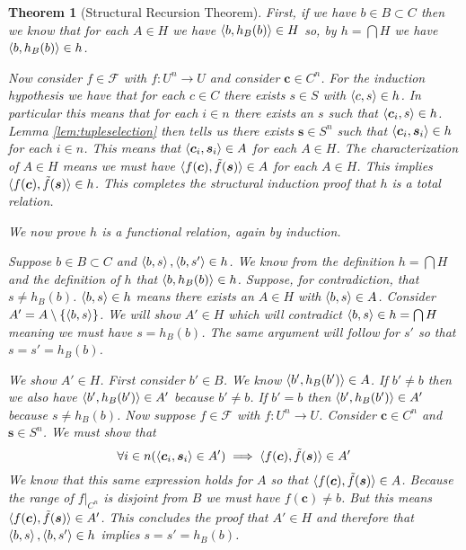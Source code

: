 \documentclass[12pt]{article}
\theoremstyle{break}
\theoremstyle{break}
\newtheorem{theorem}{Theorem}[section]
\theoremstyle{break}
\theoremstyle{break}
\theoremstyle{break}
\newtheorem{informal definition}[definition]{Informal Definition}
\newcommand{\bv}[1]{\boldsymbol{#1}}
\begin{document}
\begin{theorem}[Structural Recursion Theorem]
First, if we have $b \in B \subset C$ then we know that for each $A \in H$ we have $\braket{b, h_B(b)}\in H$ so, by $h = \bigcap H$ we have $\Braket{b, h_B(b)} \in h$.

Now consider $f\in \mathcal{F}$ with $f:U^n \to U$ and consider $\bv{c} \in C^n$.
For the induction hypothesis we have that for each $c\in C$ there exists $s\in S$ with $\braket{c, s} \in h$.
In particular this means that for each $i \in n$ there exists an $s$ such that $\braket{\bv{c}_i, s} \in h$.
Lemma \ref{lem:tupleselection} then tells us there exists $\bv{s}\in S^n$ such that $\braket{\bv{c}_i, \bv{s}_i} \in h$ for each $i\in n$.
This means that $\braket{\bv{c}_i, \bv{s}_i} \in A$ for each $A \in H$.
The characterization of $A \in H$ means we must have $\braket{f(\bv{c}), \tilde{f}(\bv{s})} \in A$ for each $A \in H$.
This implies $\braket{f(\bv{c}), \tilde{f}(\bv{s})}\in h$.
This completes the structural induction proof that $h$ is a total relation.

We now prove $h$ is a functional relation, again by induction.

Suppose $b\in B \subset C$ and $\braket{b, s}, \braket{b, s'} \in h$.
We know from the definition $h = \bigcap H$ and the definition of $h$ that $\braket{b, h_B(b)} \in h$.
Suppose, for contradiction, that $s \not = h_B(b)$.
$\braket{b, s}\in h$ means there exists an $A\in H$ with $\braket{b, s}\in A$.
Consider $A' = A \setminus\{\braket{b, s}\}$.
We will show $A'\in H$ which will contradict $\braket{b, s} \in h = \bigcap H$ meaning we must have $s = h_B(b)$.
The same argument will follow for $s'$ so that $s=s' = h_B(b)$.

We show $A' \in H$.
First consider $b'\in B$.
We know $\braket{b', h_B(b')} \in A$.
If $b' \not = b$ then we also have $\braket{b', h_B(b')} \in A'$ because $b' \not = b$.
If $b' = b$ then $\braket{b', h_B(b')} \in A'$ because $s \not = h_B(b)$.
Now suppose $f\in \mathcal{F}$ with $f:U^n \to U$.
Consider $\bv{c} \in C^n$ and $\bv{s} \in S^n$.
We must show that
$$
\forall i \in n(\braket{\bv{c}_i, \bv{s}_i} \in A') \implies \braket{f(\bv{c}), \tilde{f}(\bv{s})} \in A'
$$
We know that this same expression holds for $A$ so that $\braket{f(\bv{c}), \tilde{f}(\bv{s})} \in A$.
Because the range of $f|_{C^n}$ is disjoint from $B$ we must have $f(\bv{c}) \not= b$.
But this means $\braket{f(\bv{c}), \tilde{f}(\bv{s})} \in A'$.
This concludes the proof that $A' \in H$ and therefore that $\braket{b, s}, \braket{b, s'}\in h$ implies $s=s'=h_B(b)$.


\end{theorem}
\end{document}
